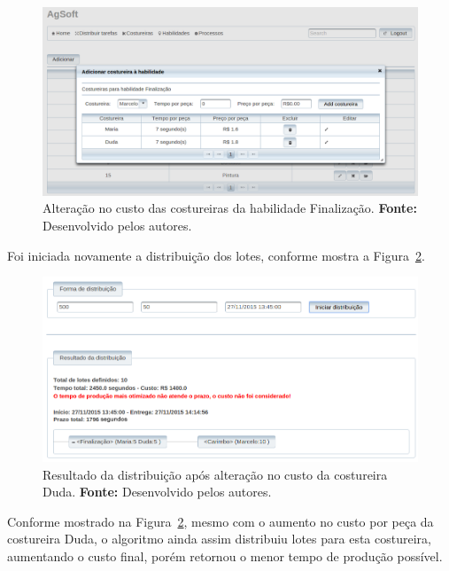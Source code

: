 \begin{figure}[h!]
	\centerline{\includegraphics[width=14.7cm]{./imagens/alterecao_custo_teste6.png}}
	\caption[Alteração no custo das costureiras da habilidade Finalização.] 
	{Alteração no custo das costureiras da habilidade Finalização. \textbf{Fonte:} Desenvolvido pelos
		autores.}
	\label{fig:alterecao_custotcseis}
\end{figure}

\par Foi iniciada novamente a distribuição dos lotes, conforme mostra a
Figura~\ref{fig:resultado2_teste6}.

\begin{figure}[h!]
	\centerline{\includegraphics[width=14.7cm]{./imagens/resultado2_teste6.png}}
	\caption[Resultado da distribuição após alteração no custo da costureira Duda.] 
	{Resultado da distribuição após alteração no custo da costureira Duda. \textbf{Fonte:} Desenvolvido pelos
	autores.}
	\label{fig:resultado2_teste6}
\end{figure}

\par Conforme mostrado na Figura~\ref{fig:resultado2_teste6}, mesmo com o
aumento no custo por peça da costureira Duda, o algoritmo ainda assim distribuiu
lotes para esta costureira, aumentando o custo final, porém retornou o
menor tempo de produção possível.

